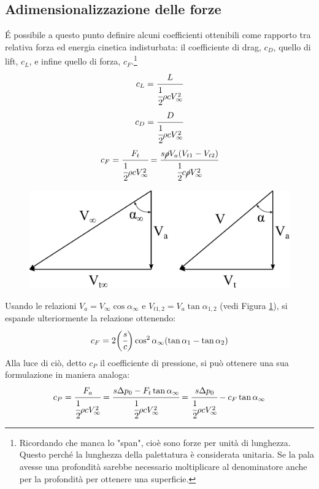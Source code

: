 \subsection{Adimensionalizzazione delle forze}
\'E possibile a questo punto definire alcuni coefficienti ottenibili come rapporto tra relativa forza ed energia cinetica indisturbata: il coefficiente di drag, $c_D$, quello di lift, $c_L$, e infine quello di forza, $c_F$.\footnote{Ricordando che manca lo "span", cioè sono forze per unità di lunghezza. Questo perché la lunghezza della palettatura è considerata unitaria. Se la pala avesse una profondità sarebbe necessario moltiplicare al denominatore anche per la profondità per ottenere una superficie.}
\begin{align*}
c_L = \cfrac{L}{\cfrac{1}{2} \rho c V_{\infty}^2}
\end{align*}
\begin{align*}
c_D = \cfrac{D}{\cfrac{1}{2} \rho c V_{\infty}^2}
\end{align*}
\begin{align*}
c_F = \cfrac{F_t}{\cfrac{1}{2} \rho c V_{\infty}^2} = \cfrac{s \cancel{\rho} V_a (V_{t1}-V_{t2})}{\cfrac{1}{2} c \cancel{\rho} V_{\infty}^2}
\end{align*}
\begin{figure}
\centering
  \includegraphics[width=.6\textwidth]{fig/trigrel.pdf}
\caption{}
\label{fig:trigrel}
\end{figure}
Usando le relazioni $V_a = V_{\infty} \cos \alpha_{\infty}$ e $V_{t1,2} = V_a \tan \alpha_{1,2}$ (vedi Figura \ref{fig:trigrel}), si espande ulteriormente la relazione ottenendo:
\begin{equation}
c_F = 2 \bigg(\cfrac{s}{c} \bigg) \cos ^ 2 \alpha_{\infty}(\tan \alpha_1 - \tan \alpha_2)
\end{equation}
Alla luce di ciò, detto $c_P$ il coefficiente di pressione, si può ottenere una sua formulazione in maniera analoga:
\begin{align*}
c_P = \cfrac{F_a}{\cfrac{1}{2} \rho c V_{\infty}^2} = \cfrac{s \Delta p_0 - F_t \tan \alpha_{\infty}}{\cfrac{1}{2} \rho c V_{\infty}^2} = \cfrac{s \Delta p_0}{\cfrac{1}{2} \rho c V_{\infty}^2} - c_F \tan \alpha_{\infty}
\end{align*}
